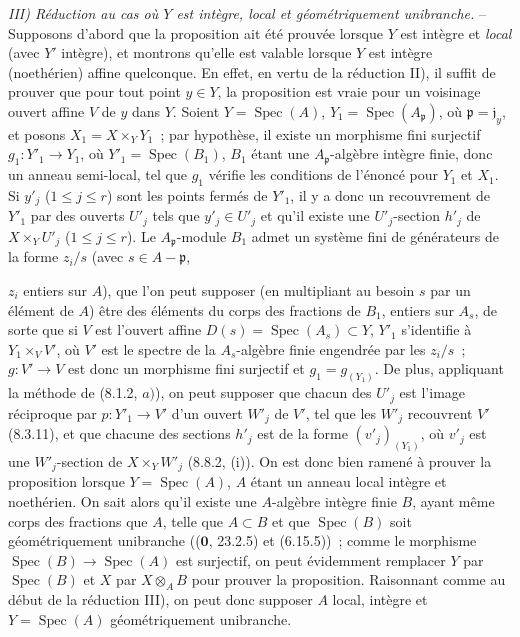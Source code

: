 \emph{III) Réduction au cas où $Y$ est intègre, local et géométriquement
unibranche.} -- Supposons d'abord que la proposition ait été prouvée lorsque $Y$
est intègre et \emph{local} (avec $Y'$ intègre), et montrons qu'elle est valable
lorsque $Y$ est intègre (noethérien) affine quelconque. En effet, en vertu de la
réduction II), il suffit de prouver que pour tout point $y\in Y$, la proposition est
vraie pour un voisinage ouvert affine $V$ de $y$ dans $Y$. Soient $Y=\operatorname{Spec}(A)$,
$Y_1=\operatorname{Spec}(A_{\mathfrak p})$, où $\mathfrak p=\mathfrak j_y$, et posons
$X_1=X\times_Y Y_1$~; par hypothèse, il existe un morphisme fini surjectif
$g_1:Y'_1\to Y_1$, où $Y'_1=\operatorname{Spec}(B_1)$, $B_1$ étant une
$A_{\mathfrak p}$-algèbre intègre finie, donc un anneau semi-local, tel que $g_1$
vérifie les conditions de l'énoncé pour $Y_1$ et $X_1$. Si $y'_j$
($1\leq j\leq r$) sont les points fermés de $Y'_1$, il y a donc un recouvrement de
$Y'_1$ par des ouverts $U'_j$ tels que $y'_j\in U'_j$ et qu'il existe une
$U'_j$-section $h'_j$ de $X\times_Y U'_j$ ($1\leq j\leq r$). Le
$A_{\mathfrak p}$-module $B_1$ admet un système fini de générateurs de la forme
$z_i/s$ (avec $s\in A-\mathfrak p$,


$z_i$ entiers sur $A$), que l'on peut supposer (en multipliant au besoin $s$ par un
élément de $A$) être des éléments du corps des fractions de $B_1$, entiers sur
$A_s$, de sorte que si $V$ est l'ouvert affine $D(s)=\operatorname{Spec}(A_s)\subset Y$, $Y'_1$
s'identifie à $Y_1\times_V V'$, où $V'$ est le spectre de la $A_s$-algèbre finie
engendrée par les $z_i/s$~; $g:V'\to V$ est donc un morphisme fini surjectif et
$g_1=g_{(Y_1)}$. De plus, appliquant la méthode de (8.1.2, $a)$), on peut supposer
que chacun des $U'_j$ est l'image réciproque par $p:Y'_1\to V'$ d'un ouvert $W'_j$
de $V'$, tel que les $W'_j$ recouvrent $V'$ (8.3.11), et que chacune des sections
$h'_j$ est de la forme $(v'_j)_{(Y_1)}$, où $v'_j$ est une $W'_j$-section de
$X\times_Y W'_j$ (8.8.2, (i)). On est donc bien ramené à prouver la proposition
lorsque $Y=\operatorname{Spec}(A)$, $A$ étant un anneau local intègre et noethérien. On sait alors
qu'il existe une $A$-algèbre intègre finie $B$, ayant même corps des fractions que
$A$, telle que $A\subset B$ et que $\operatorname{Spec}(B)$ soit géométriquement unibranche
(($\mathbf 0$, 23.2.5) et (6.15.5))~; comme le morphisme
$\operatorname{Spec}(B)\to\operatorname{Spec}(A)$ est surjectif, on peut évidemment remplacer $Y$ par
$\operatorname{Spec}(B)$ et $X$ par $X\otimes_A B$ pour prouver la proposition. Raisonnant comme
au début de la réduction III), on peut donc supposer $A$ local, intègre et
$Y=\operatorname{Spec}(A)$ géométriquement unibranche.

